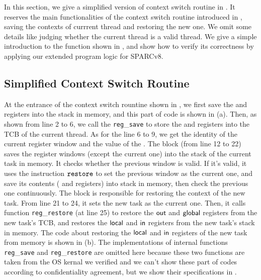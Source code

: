 In this section, we give a simplified version of context switch routine in 
\Fig{\ref{fig:Main function of context switch routine}}. It reserves the 
main functionalities of the context switch routine introduced in 
\Sec{\ref{sec:ctxswitch}}, \eg saving the contexts of currrent thread 
and restoring the new one. We omit some details like judging whether the 
current thread is a valid thread. We give a simple introduction to the 
function shown in \Fig{\ref{fig:Main function of context switch routine}}, 
and show how to verify its correctness by applying our extended program 
logic for SPARCv8. 

\subsection{Simplified Context Switch Routine}

At the entrance of the context switch rountine shown in
\Fig{\ref{fig:Main function of context switch routine}}, we first 
save the \localRN{} and \inRN{} registers into the stack in memory, 
and this part of code is shown in 
\Fig{\ref{fig:code for saving and restoring local and in}}(a). 
Then, as shown from line 2 to 6, we call the \texttt{reg}\_\texttt{save}  
to store the \outRN{} and \globalRN{} registers into the TCB 
of the current thread. As for the line 6 to 9, we get the identity of 
the current register window and the value of the \regwim{}. 
The block \SaveUsedWin{} (from line 12 to 22) saves the register windows 
(except the current one) into the stack of the current task in memory. 
It checks whether the previous window is valid. If it's valid, it 
uses the instruction $\texttt{restore}{}$ to set the previous window as the 
current one, and save its contents (\localRN{} and \inRN{} registers)
into stack in memory, then check the previous one continuously. 
The block \SwitchNewTask{} is responsible 
for restoring the context of the new task. From line 21 to 24, it 
sets the new task as the current one. Then, it calls function 
\texttt{reg}\_\texttt{restore} (at line 25)
to restore the $\textsf{out}$ and $\textsf{global}$ 
registers from the new task's TCB, and restores the  
$\textsf{local}$ and $\textsf{in}$ registers from the new task's stack in memory. 
The code about restoring the $\textsf{local}$ and $\textsf{in}$ registers of 
the new task from memory is shown in 
\Fig{\ref{fig:code for saving and restoring local and in}}(b). 
The implementations of internal functions
\texttt{reg}\_\texttt{save} and \texttt{reg}\_\texttt{restore} 
are omitted here because these two functions are taken 
from the OS kernal we verified and we can't show these part 
of codes according to confidentiality agreement, but we show 
their specifications in \Fig{\ref{fig:Specifications of Internal Functions}}.

